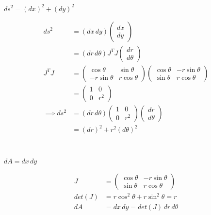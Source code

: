\documentclass[10pt]{scrartcl}
\begin{document}
\pagebreak
\begin{example}
$ds^2 = (dx)^2	+ (dy)^2$

\[
\begin{aligned}
  ds^2 &= (dx\, dy)\begin{pmatrix}
dx \\ dy	
\end{pmatrix}\\
&= (dr\, d\theta) J^TJ \begin{pmatrix}
 dr \\ d\theta	
 \end{pmatrix}\\[0.2cm]
 J^TJ &= \begin{pmatrix}
 \cos\theta & \sin\theta \\
 -r\sin\theta & r\cos\theta 	
 \end{pmatrix}
\begin{pmatrix}
\cos\theta & -r\sin\theta\\
\sin\theta & r\cos\theta 	
\end{pmatrix}\\
&= \begin{pmatrix}
 1 & 0\\
 0 & r^2	
 \end{pmatrix}\\[0.2cm]
\implies  ds^2 &= (dr \, d\theta)
\begin{pmatrix}
1 & 0 \\ 0 & r^2	
\end{pmatrix}
\begin{pmatrix}
dr \\ d\theta 	
\end{pmatrix}\\
&= (dr)^2 + r^2(d\theta)^2
\end{aligned}
\]

\end{example}~

\begin{example}
$dA = dx\,dy$

\[
\begin{aligned}
  J &= \begin{pmatrix}
 \cos\theta & -r\sin\theta\\
 \sin\theta & r\cos\theta 	
 \end{pmatrix}\\
 det(J) &= r\cos^2\theta + r\sin^2\theta = r\\
 dA &= dx\,dy = det(J)\,dr\,d\theta 
\end{aligned}
\]

\end{example}
\end{document}
